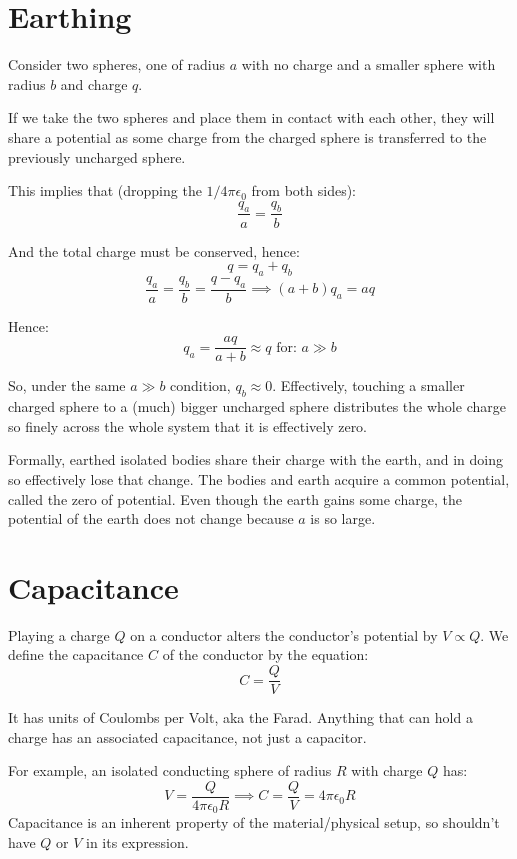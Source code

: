 
\section{Earthing}
Consider two spheres, one of radius $a$ with no charge and a smaller sphere with radius $b$ and charge $q$.

If we take the two spheres and place them in contact with each other, they will share a potential as some charge from the charged sphere is transferred to the previously uncharged sphere.

This implies that (dropping the $1/4 \pi \epsilon_0$ from both sides):
\[
 \frac{q_a}{a} = \frac{q_b}{b}
\]

And the total charge must be conserved, hence:
\[
    q = q_a + q_b
\]
\[
    \frac{q_a}{a} = \frac{q_b}{b}= \frac{q - q_a}{b} \implies (a+b)q_a = aq
\]

Hence:
\[
    q_a = \frac{aq}{a+b} \approx q \text{ for: } a \gg b
\]

So, under the same $a \gg b$ condition, $q_b \approx 0$. Effectively, touching a smaller charged sphere to a (much) bigger uncharged sphere distributes the whole charge so finely across the whole system that it is effectively zero.

Formally, earthed isolated bodies share their charge with the earth, and in doing so effectively lose that change. The bodies and earth acquire a common potential, called the zero of potential. Even though the earth gains some charge, the potential of the earth does not change because $a$ is so large.

\section{Capacitance}
Playing a charge $Q$ on a conductor alters the conductor's potential by $V \propto Q$. We define the capacitance $C$ of the conductor by the equation:
\[
    \boxed{C = \frac{Q}{V}}
\]

It has units of Coulombs per Volt, aka the Farad. Anything that can hold a charge has an associated capacitance, not just a capacitor.

For example, an isolated conducting sphere of radius $R$ with charge $Q$ has:
\[
    V = \frac{Q}{4 \pi \epsilon_0 R} \implies C = \frac{Q}{V} = 4 \pi \epsilon_0 R
\]
Capacitance is an inherent property of the material/physical setup, so shouldn't have $Q$ or $V$ in its expression.

